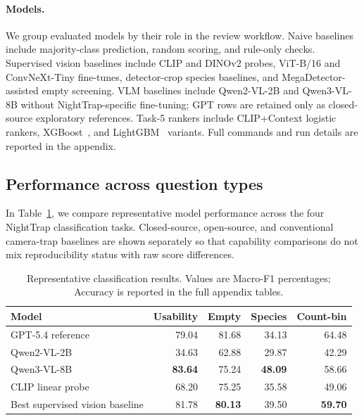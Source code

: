 \documentclass{article}
\begin{document}
\paragraph{Models.}
We group evaluated models by their role in the review workflow. Naive baselines include majority-class prediction, random scoring, and rule-only checks. Supervised vision baselines include CLIP and DINOv2 probes, ViT-B/16 and ConvNeXt-Tiny fine-tunes, detector-crop species baselines, and MegaDetector-assisted empty screening. VLM baselines include Qwen2-VL-2B and Qwen3-VL-8B without NightTrap-specific fine-tuning; GPT rows are retained only as closed-source exploratory references. Task-5 rankers include CLIP+Context logistic rankers, XGBoost~\citep{chen2016xgboost}, and LightGBM~\citep{ke2017lightgbm} variants. Full commands and run details are reported in the appendix.

\subsection{Performance across question types}

In Table~\ref{tab:workflow_main}, we compare representative model performance across the four NightTrap classification tasks. Closed-source, open-source, and conventional camera-trap baselines are shown separately so that capability comparisons do not mix reproducibility status with raw score differences.

\begin{table}[t]
\centering
\caption{Representative classification results. Values are Macro-F1 percentages; Accuracy is reported in the full appendix tables.}
\label{tab:workflow_main}
\small
\begin{tabular}{lrrrr}
\toprule
Model & Usability & Empty & Species & Count-bin \\
\midrule
GPT-5.4 reference & 79.04 & 81.68 & 34.13 & 64.48 \\
Qwen2-VL-2B & 34.63 & 62.88 & 29.87 & 42.29 \\
Qwen3-VL-8B & \textbf{83.64} & 75.24 & \textbf{48.09} & 58.66 \\
CLIP linear probe & 68.20 & 75.25 & 35.58 & 49.06 \\
Best supervised vision baseline & 81.78 & \textbf{80.13} & 39.50 & \textbf{59.70} \\
\bottomrule
\end{tabular}
\end{table}

\FloatBarrier
\end{document}
